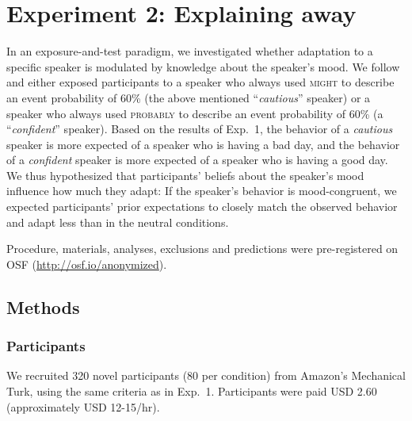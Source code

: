 \documentclass[man,floatsintext]{apa6}
\newcommand{\jd}[1]{\textcolor{Purple}{\bf [jd: #1]}}
\newcommand{\seb}[1]{\textcolor{Red}{\bf [Seb: #1]}}
\begin{document}


\section{Experiment 2: Explaining away}

In an exposure-and-test paradigm, we investigated whether adaptation to a specific speaker is modulated by knowledge about the speaker's mood. We follow \cite{Schuster2020} and either exposed participants to a speaker who always used \textsc{might} to describe an event probability of 60\% (the above mentioned ``\textit{cautious}'' speaker) or a speaker who always used \textsc{probably} to describe an event probability of 60\% (a ``\textit{confident}'' speaker). Based on the results of Exp.~1, the behavior of a \textit{cautious} speaker is more expected of a speaker who is having a bad day, and the behavior of a \textit{confident} speaker is more expected of a speaker who is having a good day. We thus hypothesized that participants' beliefs about the speaker's mood influence how much they adapt: If the speaker's behavior is mood-congruent, we expected participants' prior expectations to closely match the observed behavior and adapt less than in the neutral conditions.

Procedure, materials, analyses, exclusions and predictions were pre-registered on OSF (\url{http://osf.io/anonymized}).

\subsection{Methods}

\subsubsection{Participants} We recruited 320 novel participants (80 per condition) from Amazon's Mechanical Turk, using the same criteria as in Exp.~1. Participants were paid USD 2.60 (approximately USD 12-15/hr).
\end{document}
